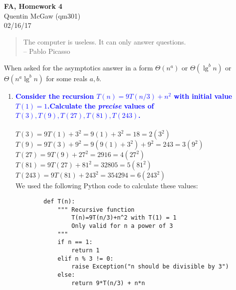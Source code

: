 \documentclass[11pt]{article}
\begin{document}
\begin{center} {\Large\bf FA, Homework 4}  \\ Quentin McGaw (qm301) \\ 02/16/17

\end{center}

\begin{quote}
The computer is useless. It can only answer questions.  \\ -- Pablo Picasso
\end{quote}

When asked for the asymptotics answer in a form $\Theta(n^a)$ or
$\Theta(\lg^bn)$ or $\Theta(n^a\lg^bn)$ for some reals $a,b$.

\begin{enumerate}
\item  \textbf{\textcolor{blue}{Consider the recursion $T(n)=9T(n/3) + n^2$ 
with initial value $T(1)=1$.Calculate the {\em precise} values of 
$T(3),T(9),T(27),T(81),T(243)$.}}
        \\\\ $T(3) = 9T(1) + 3^2 = 9(1) + 3^2 = 18 = 2(3^2)$
        \\ $T(9) = 9T(3) + 9^2 = 9(9(1) + 3^2) + 9^2 = 243 = 3(9^2)$
        \\ $T(27) = 9T(9) + 27^2 = 2916 = 4(27^2)$
        \\ $T(81) = 9T(27) + 81^2 = 32805 = 5(81^2)$
        \\ $T(243) = 9T(81) + 243^2 = 354294 = 6(243^2)$
        \\ We used the following Python code to calculate these values:
        \begin{verbatim}
        def T(n):
            """ Recursive function 
                T(n)=9T(n/3)+n^2 with T(1) = 1
                Only valid for n a power of 3
            """
            if n == 1:
                return 1
            elif n % 3 != 0:
                raise Exception("n should be divisible by 3")
            else:
                return 9*T(n/3) + n*n
        

\end{verbatim}
\end{enumerate}
\end{document}
